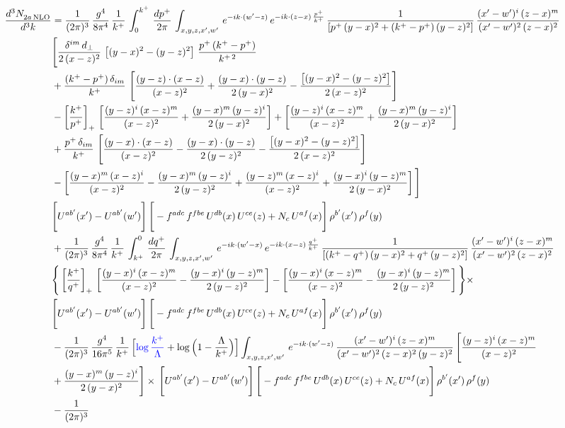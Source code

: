 \documentclass[9pt]{article}
\numberwithin{equation}{section}
\begin{document}
\begin{align}
    \frac{d^{3}N_{2a\,\rm NLO}^{\rm}}{d^{3}k}  & =  \frac{1}{(2\pi)^{3}}\, \frac{g^{4}}{8\pi^{4}}\,\frac{1}{k^{+}}\,\int_{0}^{k^{+}}\, \frac{dp^{+}}{2\pi}\,\int_{x,y,z,x',w'}\, e^{-ik\cdot(w'-z)}\,e^{-ik\cdot (z-x)\,\frac{p^{+}}{k^{+}}}\,\frac{1}{\left[p^{+}\,(y-x)^{2}+(k^{+}-p^{+})\,(y-z)^{2}\right]}\, \frac{(x'-w')^{i}\,(z-x)^{m}}{(x'-w')^{2}\,(z-x)^{2}} \notag \\ & \Bigg[\frac{\delta^{im}\,d_{\perp}}{2\,(x-z)^{2}}\,\left[(y-x)^{2}-(y-z)^{2}\right]\,\frac{p^{+}\,(k^{+}-p^{+})}{k^{+\,2}}\notag \\ & +\frac{(k^{+}-p^{+})\,\delta_{im}}{k^{+}}\,\left[\frac{(y-z)\cdot (x-z)}{(x-z)^{2}}+\frac{(y-x)\cdot (y-z)}{2\,(y-x)^{2}}-\frac{\left[(y-x)^{2}-(y-z)^{2}\right]}{2\,(x-z)^{2}}\right]\notag \\ & -\left[\frac{k^{+}}{p^{+}}\right]_{+}\,\left[\frac{(y-z)^{i}\,(x-z)^{m}}{(x-z)^{2}}+\frac{(y-x)^{m}\,(y-z)^{i}}{2\,(y-x)^{2}}\right]+ \left[\frac{(y-z)^{i}\,(x-z)^{m}}{(x-z)^{2}}+\frac{(y-x)^{m}\,(y-z)^{i}}{2\,(y-x)^{2}}\right]\notag \\ & +\frac{p^{+}\,\delta_{im}}{k^{+}}\,\left[\frac{(y-x)\cdot (x-z)}{(x-z)^{2}}-\frac{(y-x)\cdot (y-z)}{2\,(y-z)^{2}}-\frac{\left[(y-x)^{2}-(y-z)^{2}\right]}{2\,(x-z)^{2}}\right]\notag \\ &-\left[\frac{(y-x)^{m}\,(x-z)^{i}}{(x-z)^{2}}-\frac{(y-x)^{m}\,(y-z)^{i}}{2\,(y-z)^{2}}+\frac{(y-z)^{m}\,(x-z)^{i}}{(x-z)^{2}}+\frac{(y-x)^{i}\,(y-z)^{m}}{2\,(y-x)^{2}}\right]\Bigg] \notag \\ & \Bigg[U^{ab'}(x')-U^{ab'}(w')\Bigg]\,\Bigg[-f^{adc}\,f^{fbe}\,U^{db}(x)\,U^{ce}(z)+N_{c}\,U^{af}(x)\Bigg]\,\rho^{b'}(x')\,\rho^{f}(y)\notag \\ & + \frac{1}{(2\pi)^{3}}\,\frac{g^{4}}{8\pi^{4}}\,\frac{1}{k^{+}}\, \int^{0}_{k^{+}}\, \frac{dq^{+}}{2\pi} \,  \int_{x,y,z,x',w'}\,e^{-ik\cdot(w'-x)}\,e^{-ik\cdot (x-z)\,\frac{q^{+}}{k^{+}}}\,\frac{1}{\left[(k^{+}-q^{+})\,(y-x)^{2}+q^{+}\,(y-z)^{2}\right]}\, \frac{(x'-w')^{i}\,(z-x)^{m}}{(x'-w')^{2}\,(z-x)^{2}} \notag \\ &\Bigg\{\left[\frac{k^{+}}{q^{+}}\right]_{+}\,\left[\frac{(y-x)^{i}\,(x-z)^{m}}{(x-z)^{2}}-\frac{(y-x)^{i}\,(y-z)^{m}}{2\,(y-z)^{2}}\right] -\left[\frac{(y-x)^{i}\,(x-z)^{m}}{(x-z)^{2}}-\frac{(y-x)^{i}\,(y-z)^{m}}{2\,(y-z)^{2}}\right]\Bigg\}\times\,\notag \\ & \Bigg[U^{ab'}(x')-U^{ab'}(w')\Bigg]\,\Bigg[-f^{adc}\,f^{fbe}\,U^{db}(x)\,U^{ce}(z)+N_{c}\,U^{af}(x)\Bigg]\,\rho^{b'}(x')\,\rho^{f}(y)\notag \\ & - \frac{1}{(2\pi)^{3}}\, \frac{g^{4}}{16\pi^{5}}\,\frac{1}{k^{+}}\,\Big[{\color{blue}\log\frac{k^{+}}{\Lambda}}+\log\Big(1-\frac{\Lambda}{k^{+}}\Big)\Big] \int_{x,y,z,x',w'}\,e^{-ik\cdot(w'-z)}\, \frac{(x'-w')^{i}\,(z-x)^{m}}{(x'-w')^{2}\,(z-x)^{2}\, (y-z)^{2}}\,\Bigg[\frac{(y-z)^{i}\,(x-z)^{m}}{(x-z)^{2}}\notag \\ & +\frac{(y-x)^{m}\,(y-z)^{i}}{2\,(y-x)^{2}}\Bigg]\times\, \Bigg[U^{ab'}(x')-U^{ab'}(w')\Bigg]\,\Bigg[-f^{adc}\,f^{fbe}\,U^{db}(x)\,U^{ce}(z)+N_{c}\,U^{af}(x)\Bigg]\,\rho^{b'}(x')\,\rho^{f}(y)\notag \\ & - \frac{1}{(2\pi)^{3}}\, 
\end{align}
\end{document}
